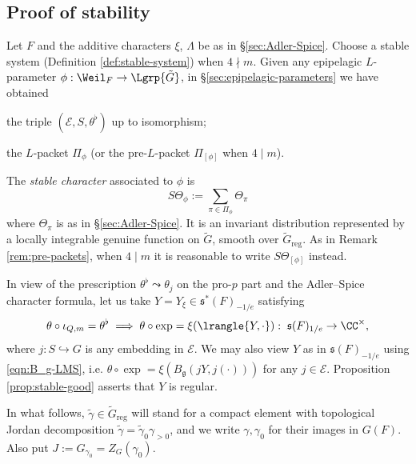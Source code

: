 \documentclass[a4paper,10pt]{article}
\begin{document}
\subsection{Proof of stability}\label{sec:stability}
Let $F$ and the additive characters $\xi$, $\Lambda$ be as in \S\ref{sec:Adler-Spice}. Choose a stable system (Definition \ref{def:stable-system}) when $4 \nmid m$. Given any epipelagic $L$-parameter $\phi: \Weil_F \to \Lgrp{\tilde{G}}$, in \S\ref{sec:epipelagic-parameters} we have obtained
\begin{compactitem}
	\item the triple $(\mathcal{E}, S, \theta^\flat)$ up to isomorphism;
	\item the $L$-packet $\Pi_\phi$ (or the pre-$L$-packet $\Pi_{[\phi]}$ when $4 \mid m$).
\end{compactitem}

\begin{definition}
	The \emph{stable character} associated to $\phi$ is
	\[ S\Theta_\phi := \sum_{\pi \in \Pi_\phi} \Theta_\pi \]
	where $\Theta_\pi$ is as in \S\ref{sec:Adler-Spice}. It is an invariant distribution represented by a locally integrable genuine function on $\tilde{G}$, smooth over $\tilde{G}_\text{reg}$. As in Remark \ref{rem:pre-packets}, when $4 \mid m$ it is reasonable to write $S\Theta_{[\phi]}$ instead.
\end{definition}

In view of the prescription $\theta^\flat \leadsto \theta_j$ on the pro-$p$ part and the Adler--Spice character formula, let us take $Y = Y_\xi \in \mathfrak{s}^*(F)_{-1/e}$ satisfying
\begin{equation}\label{eqn:Y-theta}
	\theta \circ \iota_{Q,m} = \theta^\flat \implies \theta \circ \exp = \xi( \lrangle{Y, \cdot}): \; \mathfrak{s}(F)_{1/e} \to \CC^\times,
\end{equation}
where $j: S \hookrightarrow G$ is any embedding in $\mathcal{E}$. We may also view $Y$ as in $\mathfrak{s}(F)_{-1/e}$ using \eqref{eqn:B_g-LMS}, i.e. $\theta \circ \exp = \xi(B_{\mathfrak{g}}(jY, j(\cdot)))$ for any $j \in \mathcal{E}$. Proposition \ref{prop:stable-good} asserts that $Y$ is regular.

In what follows, $\tilde{\gamma} \in \tilde{G}_{\mathrm{reg}}$ will stand for a compact element with topological Jordan decomposition $\tilde{\gamma} = \tilde{\gamma}_0 \gamma_{>0}$, and we write $\gamma, \gamma_0$ for their images in $G(F)$. Also put $J := G_{\gamma_0} = Z_G(\gamma_0)$. 
\end{document}
